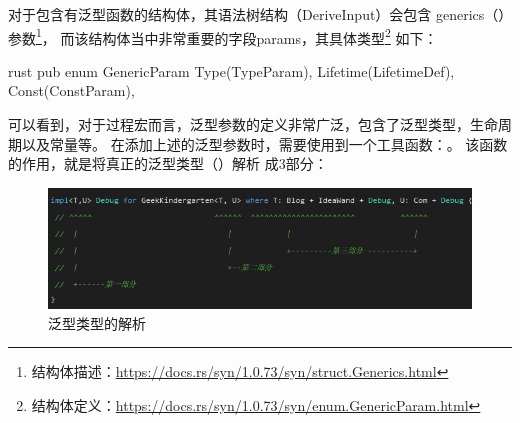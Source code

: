 对于包含有泛型函数的结构体，其语法树结构（DeriveInput）会包含
generics（）参数\footnote{结构体描述：\url{https://docs.rs/syn/1.0.73/syn/struct.Generics.html}}，
而该结构体当中非常重要的字段params，其具体类型\footnote{结构体定义：\url{https://docs.rs/syn/1.0.73/syn/enum.GenericParam.html}}
如下：
\begin{code-block}{rust}
pub enum GenericParam {
    Type(TypeParam),
    Lifetime(LifetimeDef),
    Const(ConstParam),
}
\end{code-block}
可以看到，对于过程宏而言，泛型参数的定义非常广泛，包含了泛型类型，生命周期以及常量等。
在添加上述的泛型参数时，需要使用到一个工具函数：。
该函数的作用，就是将真正的泛型类型（）解析
成3部分：
\begin{figure}[H]
  \centering
  \includegraphics[width=\linewidth]{rust_impl_split.png}
  \caption{泛型类型的解析}
  \label{fig:rust_impl_split}
\end{figure}

